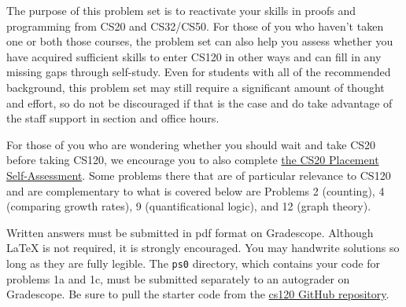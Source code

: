 \documentclass[11pt]{article}
\begin{document}

The purpose of this problem set is to reactivate your skills in proofs and programming from CS20 and CS32/CS50. For those of you who haven't taken one or both those courses, the problem set can also help you assess whether you have acquired sufficient skills to enter CS120 in other ways and can fill in any missing gaps through self-study. Even for students with all of the recommended background, this problem set may still require a significant amount of thought and effort, so do not be discouraged if that is the case and do take advantage of the staff support in section and office hours. 

For those of you who are wondering whether you should wait and take CS20 before taking CS120, we encourage you to also complete  \href{https://drive.google.com/file/d/1QIJR6sb9hfkK67PhpQaK9KQBzYwzXvsW/view}{the CS20 Placement Self-Assessment}.  Some problems there that are of particular relevance to CS120 and are complementary to what is covered below are Problems 2 (counting), 4 (comparing growth rates), 9 (quantificational logic), and 12 (graph theory). 

Written answers must be submitted in pdf format on Gradescope. Although \LaTeX{} is not required, it is strongly encouraged. You may handwrite solutions so long as they are fully legible. The \texttt{ps0} directory, which contains your code for problems 1a and 1c, must be submitted separately to an autograder on Gradescope. Be sure to pull the starter code from the \href{https://github.com/Harvard-CS-120/cs120}{cs120 GitHub repository}.

 \newcommand{\children}{\mathit{children}}
 \renewcommand{\treeroot}{\mathit{treeroot}}
 \newcommand{\parent}{\mathit{parent}}
 
\end{document}
